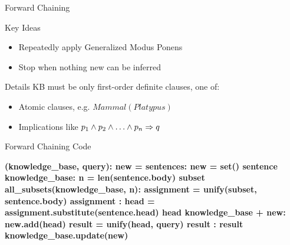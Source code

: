 \documentclass[14pt]{beamer}
\begin{document}
\begin{frame}{Forward Chaining}
	\begin{block}{Key Ideas}
		\begin{itemize}
			\item Repeatedly apply Generalized Modus Ponens
			\item Stop when nothing new can be inferred
		\end{itemize}
	\end{block}
	\pause
	\begin{block}{Details}
		KB must be only \alert{first-order definite clauses}, one of:
		\begin{itemize}
			\item Atomic clauses, e.g. $\textit{Mammal}(\textit{Platypus})$
			\item Implications like $p_1 \land p_2 \land \ldots \land p_n \Rightarrow q$
		\end{itemize}
	\end{block}
\end{frame}
\begin{frame}[fragile]{Forward Chaining Code}
	\begin{semiverbatim}\bfseries\scriptsize
		 (knowledge_base, query):
		    \pause{}
		    new = 
		     sentences:
		        new = set()
		         sentence  knowledge_base:
		            \pause{}
		            n = len(sentence.body)
		             subset  all_subsets(knowledge_base, n):
		                assignment = unify(subset, sentence.body)
		                 assignment  :
		                    \pause{}
		                    head = assignment.substitute(sentence.head)
		                     head  knowledge_base + new:
		                        new.add(head)
		                        \pause{}
		                        result = unify(head, query)
		                         result  :
		                             result
		        knowledge_base.update(new)
	\end{semiverbatim}
\end{frame}
\end{document}
